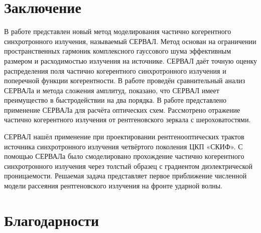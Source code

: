 \chapter*{Заключение}						%


В работе представлен новый метод моделирования частично когерентного синхротронного излучения, называемый СЕРВАЛ. Метод основан на ограничении пространственных гармоник комплексного гауссового шума эффективным размером и расходимостью излучения на источнике. СЕРВАЛ даёт точную оценку распределения поля частично когерентного синхротронного излучения и поперечной функции когерентности. В работе проведён сравнительный анализ СЕРВАЛа и метода сложения амплитуд, показано, что СЕРВАЛ имеет преимущество в быстродействии на два порядка. В работе представлено применение СЕРВАЛа для расчёта оптических схем. Рассмотрено отражение частично когерентного излучения от рентгеновского зеркала с шероховатостями. 

СЕРВАЛ нашёл применение при проектировании рентгенооптических трактов источника синхротронного излучения четвёртого поколения ЦКП «СКИФ». С помощью СЕРВАЛа было смоделировано прохождение частично когерентного синхротронного излучения через толстый образец с градиентом диэлектрической проницаемости. Решаемая задача представляет первое приближение численной модели рассеяния рентгеновского излучения на фронте ударной волны. 
\newpage
%
\chapter*{Благодарности}						%